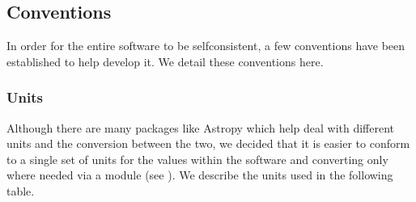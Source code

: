 \documentclass[letterpaper,11pt,english]{sphinxmanual}
\begin{document}
\sphinxstepscope


\subsection{Conventions}
\label{\detokenize{technical/conventions:conventions}}\label{\detokenize{technical/conventions:technical-conventions}}\label{\detokenize{technical/conventions::doc}}
\sphinxAtStartPar
In order for the entire software to be self\sphinxhyphen{}consistent, a few conventions
have been established to help develop it. We detail these conventions here.


\subsubsection{Units}
\label{\detokenize{technical/conventions:units}}
\sphinxAtStartPar
Although there are many packages like Astropy which help deal with different
units and the conversion between the two, we decided that it is easier to
conform to a single set of units for the values within the software and
converting only where needed via a module (see
{\hyperref[\detokenize{technical/architecture/library:technical-architecture-library-conversion}]{}}). We describe the units used
in the following table.
\end{document}
